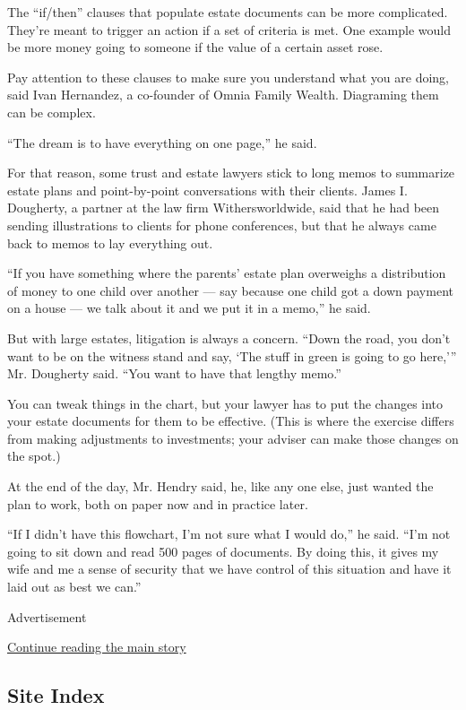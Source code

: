The ``if/then'' clauses that populate estate documents can be more
complicated. They're meant to trigger an action if a set of criteria is
met. One example would be more money going to someone if the value of a
certain asset rose.

Pay attention to these clauses to make sure you understand what you are
doing, said Ivan Hernandez, a co-founder of Omnia Family Wealth.
Diagraming them can be complex.

``The dream is to have everything on one page,'' he said.

For that reason, some trust and estate lawyers stick to long memos to
summarize estate plans and point-by-point conversations with their
clients. James I. Dougherty, a partner at the law firm Withersworldwide,
said that he had been sending illustrations to clients for phone
conferences, but that he always came back to memos to lay everything
out.

``If you have something where the parents' estate plan overweighs a
distribution of money to one child over another --- say because one
child got a down payment on a house --- we talk about it and we put it
in a memo,'' he said.

But with large estates, litigation is always a concern. ``Down the road,
you don't want to be on the witness stand and say, `The stuff in green
is going to go here,''' Mr. Dougherty said. ``You want to have that
lengthy memo.''

You can tweak things in the chart, but your lawyer has to put the
changes into your estate documents for them to be effective. (This is
where the exercise differs from making adjustments to investments; your
adviser can make those changes on the spot.)

At the end of the day, Mr. Hendry said, he, like any one else, just
wanted the plan to work, both on paper now and in practice later.

``If I didn't have this flowchart, I'm not sure what I would do,'' he
said. ``I'm not going to sit down and read 500 pages of documents. By
doing this, it gives my wife and me a sense of security that we have
control of this situation and have it laid out as best we can.''

Advertisement

\protect\hyperlink{after-bottom}{Continue reading the main story}

\hypertarget{site-index}{%
\subsection{Site Index}\label{site-index}}

